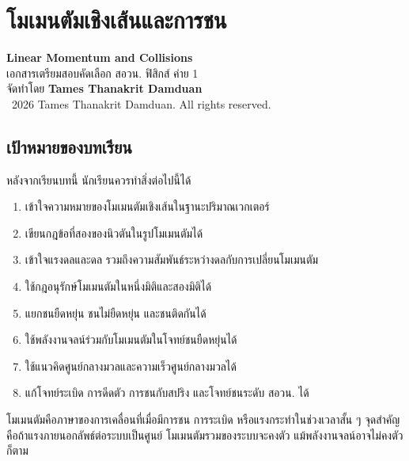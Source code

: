 
\chapter{โมเมนตัมเชิงเส้นและการชน}

\begin{center}
    {\Large \textbf{Linear Momentum and Collisions}}\\[4pt]
    {\normalsize เอกสารเตรียมสอบคัดเลือก สอวน. ฟิสิกส์ ค่าย 1}\\[6pt]
    {\normalsize จัดทำโดย \textbf{Tames Thanakrit Damduan}}\\[2pt]
    {\footnotesize \textcopyright\ 2026 Tames Thanakrit Damduan. All rights reserved.}\\[8pt]
\end{center}

\section*{เป้าหมายของบทเรียน}

หลังจากเรียนบทนี้ นักเรียนควรทำสิ่งต่อไปนี้ได้

\begin{enumerate}
    \item เข้าใจความหมายของโมเมนตัมเชิงเส้นในฐานะปริมาณเวกเตอร์
    \item เขียนกฎข้อที่สองของนิวตันในรูปโมเมนตัมได้
    \item เข้าใจแรงดลและดล รวมถึงความสัมพันธ์ระหว่างดลกับการเปลี่ยนโมเมนตัม
    \item ใช้กฎอนุรักษ์โมเมนตัมในหนึ่งมิติและสองมิติได้
    \item แยกชนยืดหยุ่น ชนไม่ยืดหยุ่น และชนติดกันได้
    \item ใช้พลังงานจลน์ร่วมกับโมเมนตัมในโจทย์ชนยืดหยุ่นได้
    \item ใช้แนวคิดศูนย์กลางมวลและความเร็วศูนย์กลางมวลได้
    \item แก้โจทย์ระเบิด การดีดตัว การชนกับสปริง และโจทย์ชนระดับ สอวน. ได้
\end{enumerate}

\begin{tcolorbox}[title=แนวคิดสำคัญของบทนี้]
โมเมนตัมคือภาษาของการเคลื่อนที่เมื่อมีการชน การระเบิด หรือแรงกระทำในช่วงเวลาสั้น ๆ จุดสำคัญคือถ้าแรงภายนอกลัพธ์ต่อระบบเป็นศูนย์ โมเมนตัมรวมของระบบจะคงตัว แม้พลังงานจลน์อาจไม่คงตัวก็ตาม
\end{tcolorbox}

